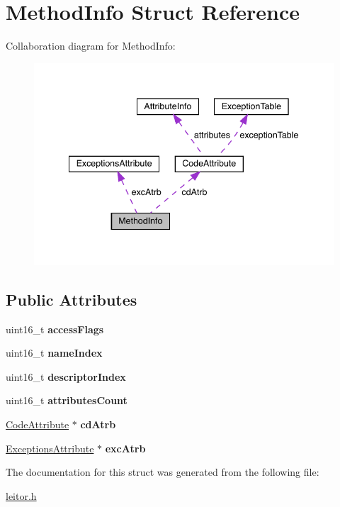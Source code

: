 \hypertarget{structMethodInfo}{}\section{Method\+Info Struct Reference}
\label{structMethodInfo}


Collaboration diagram for Method\+Info\+:
\nopagebreak
\begin{figure}[H]
\begin{center}
\leavevmode
\includegraphics[width=341pt]{structMethodInfo__coll__graph}
\end{center}
\end{figure}
\subsection*{Public Attributes}
\begin{DoxyCompactItemize}
\item 
\mbox{\label{structMethodInfo_a1075fd2ba433b27d9b04dec3a78de9f3}} 
uint16\+\_\+t {\bfseries access\+Flags}
\item 
\mbox{\label{structMethodInfo_a946349e82f47156b63c58e57061d6891}} 
uint16\+\_\+t {\bfseries name\+Index}
\item 
\mbox{\label{structMethodInfo_a4be51921e4147d189cc314b9b3a75161}} 
uint16\+\_\+t {\bfseries descriptor\+Index}
\item 
\mbox{\label{structMethodInfo_a0980de52cac7b97181222b39b28e0fe0}} 
uint16\+\_\+t {\bfseries attributes\+Count}
\item 
\mbox{\label{structMethodInfo_a6e5b903a4ae8fdf418b3955b93ded1c4}} 
\mbox{\hyperlink{structCodeAttribute}{Code\+Attribute}} $\ast$ {\bfseries cd\+Atrb}
\item 
\mbox{\label{structMethodInfo_ae09864e7cbb1f6423209b89a1ecb70a8}} 
\mbox{\hyperlink{structExceptionsAttribute}{Exceptions\+Attribute}} $\ast$ {\bfseries exc\+Atrb}
\end{DoxyCompactItemize}


The documentation for this struct was generated from the following file\+:\begin{DoxyCompactItemize}
\item 
\mbox{\hyperlink{leitor_8h}{leitor.\+h}}\end{DoxyCompactItemize}
